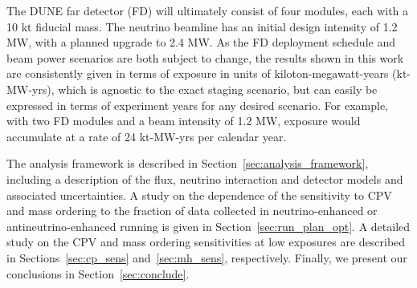 The DUNE far detector (FD) will ultimately consist of four modules, each with a 10 kt fiducial mass. The neutrino beamline has an initial design intensity of 1.2 MW, with a planned upgrade to 2.4 MW. As the FD deployment schedule and beam power scenarios are both subject to change, the results shown in this work are consistently given in terms of exposure in units of kiloton-megawatt-years (kt-MW-yrs), which is agnostic to the exact staging scenario, but can easily be expressed in terms of experiment years for any desired scenario. For example, with two FD modules and a beam intensity of 1.2 MW, exposure would accumulate at a rate of 24 kt-MW-yrs per calendar year.

The analysis framework is described in Section~\ref{sec:analysis_framework}, including a description of the flux, neutrino interaction and detector models and associated uncertainties. A study on the dependence of the sensitivity to CPV and mass ordering to the fraction of data collected in neutrino-enhanced or antineutrino-enhanced running is given in Section~\ref{sec:run_plan_opt}. A detailed study on the CPV and mass ordering sensitivities at low exposures are described in Sections~\ref{sec:cp_sens} and~\ref{sec:mh_sens}, respectively. Finally, we present our conclusions in Section~\ref{sec:conclude}.

